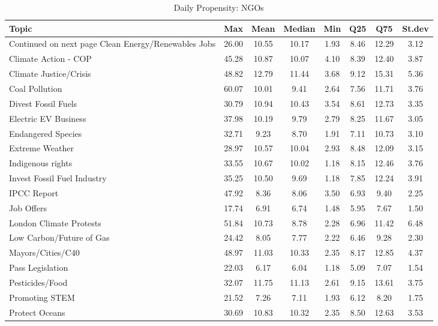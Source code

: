 \begin{longtable}{L|ccccccc}
\caption{Daily Propensity: NGOs} \\ 
  \hline
Topic & Max & Mean & Median & Min & Q25 & Q75 & St.dev \\ 
  \hline 
\endhead 
\hline 
{\footnotesize Continued on next page} 
\endfoot 
\endlastfoot 
Clean Energy/Renewables Jobs & 26.00 & 10.55 & 10.17 & 1.93 & 8.46 & 12.29 & 3.12 \\ 
  Climate Action - COP & 45.28 & 10.87 & 10.07 & 4.10 & 8.39 & 12.40 & 3.87 \\ 
  Climate Justice/Crisis & 48.82 & 12.79 & 11.44 & 3.68 & 9.12 & 15.31 & 5.36 \\ 
  Coal Pollution & 60.07 & 10.01 & 9.41 & 2.64 & 7.56 & 11.71 & 3.76 \\ 
  Divest Fossil Fuels & 30.79 & 10.94 & 10.43 & 3.54 & 8.61 & 12.73 & 3.35 \\ 
  Electric EV Business & 37.98 & 10.19 & 9.79 & 2.79 & 8.25 & 11.67 & 3.05 \\ 
  Endangered Species & 32.71 & 9.23 & 8.70 & 1.91 & 7.11 & 10.73 & 3.10 \\ 
  Extreme Weather & 28.97 & 10.57 & 10.04 & 2.93 & 8.48 & 12.09 & 3.15 \\ 
  Indigenous rights & 33.55 & 10.67 & 10.02 & 1.18 & 8.15 & 12.46 & 3.76 \\ 
  Invest Fossil Fuel Industry & 35.25 & 10.50 & 9.69 & 1.18 & 7.85 & 12.24 & 3.91 \\ 
  IPCC Report & 47.92 & 8.36 & 8.06 & 3.50 & 6.93 & 9.40 & 2.25 \\ 
  Job Offers & 17.74 & 6.91 & 6.74 & 1.48 & 5.95 & 7.67 & 1.50 \\ 
  London Climate Protests & 51.84 & 10.73 & 8.78 & 2.28 & 6.96 & 11.42 & 6.48 \\ 
  Low Carbon/Future of Gas & 24.42 & 8.05 & 7.77 & 2.22 & 6.46 & 9.28 & 2.30 \\ 
  Mayors/Cities/C40 & 48.97 & 11.03 & 10.33 & 2.35 & 8.17 & 12.85 & 4.37 \\ 
  Pass Legislation & 22.03 & 6.17 & 6.04 & 1.18 & 5.09 & 7.07 & 1.54 \\ 
  Pesticides/Food & 32.07 & 11.75 & 11.13 & 2.61 & 9.15 & 13.61 & 3.75 \\ 
  Promoting STEM & 21.52 & 7.26 & 7.11 & 1.93 & 6.12 & 8.20 & 1.75 \\ 
  Protect Oceans & 30.69 & 10.83 & 10.32 & 2.35 & 8.50 & 12.63 & 3.53 \\ 

\end{longtable}
